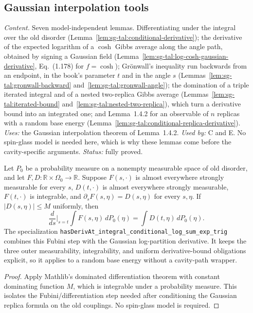 \subsection{Gaussian interpolation tools}
\label{sec:sg-tal:cavity-tools}

\emph{Content.} Seven model-independent lemmas.  Differentiating under the integral over the old
disorder (Lemma~\ref{lem:sg-tal:conditional-derivative}); the derivative of the expected logarithm
of a $\cosh$ Gibbs average along the angle path, obtained by signing a Gaussian field
(Lemma~\ref{lem:sg-tal:log-cosh-gaussian-derivative}, Eq.~(1.178) for $f=\cosh$); Gr\"onwall's
inequality run backwards from an endpoint, in the book's parameter $t$ and in the angle $s$
(Lemmas~\ref{lem:sg-tal:gronwall-backward} and~\ref{lem:sg-tal:gronwall-angle}); the domination of
a triple iterated integral and of a nested two-replica Gibbs average
(Lemmas~\ref{lem:sg-tal:iterated-bound} and~\ref{lem:sg-tal:nested-two-replica}), which
turn a derivative bound into an integrated one; and Lemma~1.4.2 for an observable of $n$ replicas
with a random base energy (Lemma~\ref{lem:sg-tal:conditional-replica-derivative}).
\emph{Uses:} the Gaussian interpolation theorem of Lemma~1.4.2.  \emph{Used by:} C and E.
No spin-glass model is needed here, which is why these lemmas come before the cavity-specific
arguments.  \emph{Status:} fully proved.

\begin{lemma}
\label{lem:sg-tal:conditional-derivative}
  \leanok
{}
Let $P_0$ be a probability measure on a nonempty measurable space of old
disorder, and let $F,D:\mathbb R\times\Omega_0\to\mathbb R$.
Suppose $F(s,\cdot)$ is almost everywhere strongly measurable for every $s$,
$D(t,\cdot)$ is almost everywhere strongly measurable, $F(t,\cdot)$ is
integrable, and $\partial_s F(s,\eta)=D(s,\eta)$ for every $s,\eta$.
If $|D(s,\eta)|\le M$ uniformly, then
\[
\frac{d}{ds}\bigg|_{s=t}\int F(s,\eta)\,dP_0(\eta)
=\int D(t,\eta)\,dP_0(\eta).
\]
The specialization \texttt{hasDerivAt\_integral\_conditional\_log\_sum\_exp\_trig}
combines this Fubini step with the Gaussian log-partition derivative.  It keeps the three
outer measurability, integrability, and uniform derivative-bound obligations explicit, so it
applies to a random base energy without a cavity-path wrapper.
\end{lemma}
\begin{proof}
  \leanok
Apply Mathlib's dominated differentiation theorem with constant dominating
function $M$, which is integrable under a probability measure. This isolates
the Fubini/differentiation step needed after conditioning the Gaussian
replica formula on the old couplings. No spin-glass model is required.
\end{proof}

